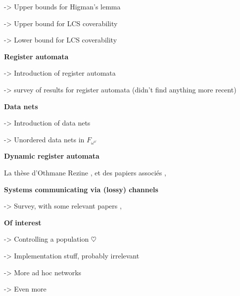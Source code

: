 	\cite{SchmitzS2011upperHigman} -> Upper bounds for Higman's lemma
	
	\cite{ChambartS2008ordinal} -> Upper bound for LCS coverability 
	
	\cite{Schnoebelen2002verifying} -> Lower bound for LCS coverability 
	

	\textbf{Register automata}
	
	\cite{kaminski1994finite} -> Introduction of register automata
	
	\cite{segoufin2006automata} -> survey of results for register automata (didn't find anything more recent)
	
	\textbf{Data nets}
	
	\cite{lazic2007nets} -> Introduction of data nets
	
	\cite{ROSAVELARDO201741} -> Unordered data nets in $F_{\omega^\omega}$
	
	\textbf{Dynamic register automata}
	
	La thèse d'Othmane Rezine \cite{Rezine2017verification}, et des papiers associés 
	\cite{AbdullaAKR2014verification},
	\cite{AbdullaAKR2015verification}
	
	\textbf{Systems communicating via (lossy) channels}
	
	\cite{Aiswarya2021network} -> Survey, with some relevant papers 	\cite{Aiswarya2015model},
	\cite{AbdullaAA2016data}
	
	\textbf{Of interest}
	
	\cite{BertrandDGGG2018controlling} -> Controlling a population $\heartsuit$
	
	\cite{baldoni2009implementing} -> Implementation stuff, probably irrelevant
	 	
	\cite{DelzannoSZ2011cliquesAdhoc} -> More ad hoc networks
	
	\cite{DBLP:journals/tcs/AbdullaDRST16} -> Even more
	
